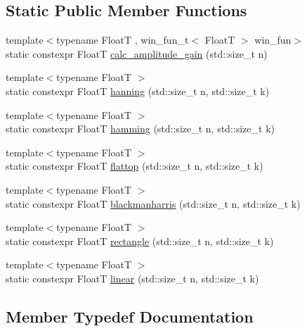 \subsection*{Static Public Member Functions}
\begin{DoxyCompactItemize}
\item 
{\footnotesize template$<$typename FloatT , win\+\_\+fun\+\_\+t$<$ Float\+T $>$ win\+\_\+fun$>$ }\\static constexpr FloatT \hyperlink{structdevfix_1_1dsp_1_1window_aeba7905479c64bca5ac2fce0c6dbbf0b}{calc\+\_\+amplitude\+\_\+gain} (std\+::size\+\_\+t n)
\item 
{\footnotesize template$<$typename FloatT $>$ }\\static constexpr FloatT \hyperlink{structdevfix_1_1dsp_1_1window_a94b16d1da4a560e625ae93284ed6f1a4}{hanning} (std\+::size\+\_\+t n, std\+::size\+\_\+t k)
\item 
{\footnotesize template$<$typename FloatT $>$ }\\static constexpr FloatT \hyperlink{structdevfix_1_1dsp_1_1window_ab4cca67d04f3380ac55bcc0a347624f2}{hamming} (std\+::size\+\_\+t n, std\+::size\+\_\+t k)
\item 
{\footnotesize template$<$typename FloatT $>$ }\\static constexpr FloatT \hyperlink{structdevfix_1_1dsp_1_1window_a43beeead6e8922f5be05b6e17f7f2664}{flattop} (std\+::size\+\_\+t n, std\+::size\+\_\+t k)
\item 
{\footnotesize template$<$typename FloatT $>$ }\\static constexpr FloatT \hyperlink{structdevfix_1_1dsp_1_1window_ab01ab810661e7cd05d0616e6dd1eeaca}{blackmanharris} (std\+::size\+\_\+t n, std\+::size\+\_\+t k)
\item 
{\footnotesize template$<$typename FloatT $>$ }\\static constexpr FloatT \hyperlink{structdevfix_1_1dsp_1_1window_a15b34e7a9a7b76046b63347ac56b3236}{rectangle} (std\+::size\+\_\+t n, std\+::size\+\_\+t k)
\item 
{\footnotesize template$<$typename FloatT $>$ }\\static constexpr FloatT \hyperlink{structdevfix_1_1dsp_1_1window_a334a42b01504381fb13459f566aa2025}{linear} (std\+::size\+\_\+t n, std\+::size\+\_\+t k)
\end{DoxyCompactItemize}


\subsection{Member Typedef Documentation}
\mbox{\label{structdevfix_1_1dsp_1_1window_a821ff669dee3e30555dcf32e7643dd0e}} 
